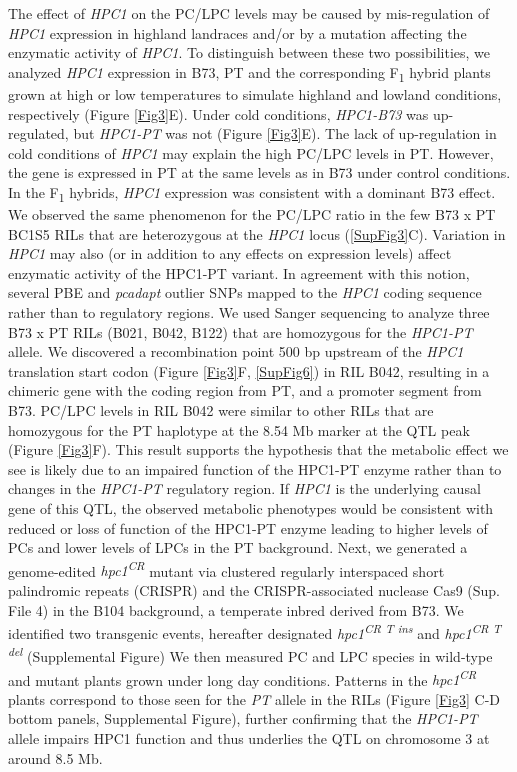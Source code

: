 \documentclass[9pt,twocolumn,twoside,lineno]{biorxiv}
\begin{document}
The effect of \textit{HPC1} on the PC/LPC levels may be caused by mis-regulation of \textit{HPC1} expression in highland landraces and/or by a mutation affecting the enzymatic activity of \textit{HPC1}. 
To distinguish between these two possibilities, we analyzed \textit{HPC1} expression in B73, PT and the corresponding F\textsubscript{1} hybrid plants grown at high or low temperatures to simulate highland and lowland conditions, respectively (Figure \ref{Fig3}E). 
Under cold conditions, \textit{HPC1-B73} was up-regulated, but \textit{HPC1-PT} was not (Figure \ref{Fig3}E). 
The lack of up-regulation in cold conditions of \textit{HPC1} may explain the high PC/LPC levels in PT.
However, the gene is expressed in PT at the same levels as in B73 under control conditions.
In the F\textsubscript{1} hybrids, \textit{HPC1} expression was consistent with a dominant B73 effect. 
We observed the same phenomenon for the PC/LPC ratio in the few B73 x PT BC1S5 RILs that are heterozygous at the \textit{HPC1} locus (\ref{SupFig3}C).
Variation in \textit{HPC1} may also (or in addition to any effects on expression levels) affect enzymatic activity of the HPC1-PT variant. In agreement with this notion, several PBE and \textit{pcadapt} outlier SNPs mapped to the \textit{HPC1} coding sequence rather than to regulatory regions. 
We used Sanger sequencing to analyze three B73 x PT RILs (B021, B042, B122) that are homozygous for the \textit{HPC1-PT} allele.
We discovered a recombination point 500 bp upstream of the \textit{HPC1} translation start codon (Figure \ref{Fig3}F, \ref{SupFig6}) in RIL B042, resulting in a chimeric gene with the coding region from PT, and a promoter segment from B73.
PC/LPC levels in RIL B042 were similar to other RILs that are homozygous for the PT haplotype at the 8.54 Mb marker at the QTL peak (Figure \ref{Fig3}F). 
This result supports the hypothesis that the metabolic effect we see is likely due to an impaired function of the HPC1-PT enzyme rather than to changes in the \textit{HPC1-PT} regulatory region.
If \textit{HPC1} is the underlying causal gene of this QTL, the observed metabolic phenotypes would be consistent with reduced or loss of function of the HPC1-PT enzyme leading to higher levels of PCs and lower levels of LPCs in the PT background. 
Next, we generated a genome-edited \textit{hpc1\textsuperscript{CR}} mutant via clustered regularly interspaced short palindromic repeats (CRISPR) and the CRISPR-associated nuclease Cas9 (Sup. File 4) in the B104 background, a temperate inbred derived from B73. 
We identified two transgenic events, hereafter designated \textit{hpc1\textsuperscript{CR T ins}} and \textit{hpc1\textsuperscript{CR T del}} (Supplemental Figure)
We then measured PC and LPC species in wild-type and mutant plants grown under long day conditions. %
Patterns in the \textit{hpc1\textsuperscript{CR}} plants 
correspond to those seen for the \textit{PT} allele in the RILs (Figure \ref{Fig3} C-D bottom panels, Supplemental Figure), further confirming that the \textit{HPC1-PT} allele impairs HPC1 function and thus underlies the QTL on chromosome 3 at around 8.5 Mb. 
\end{document}
